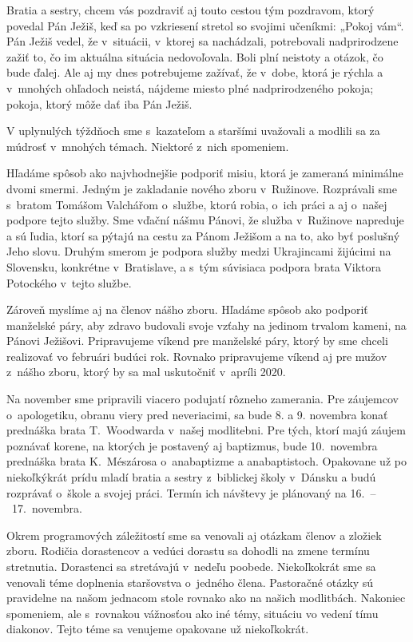 

Bratia a sestry, chcem vás pozdraviť aj touto cestou tým pozdravom, ktorý povedal Pán Ježiš, keď sa po vzkriesení stretol so svojimi učeníkmi: „Pokoj vám“. Pán Ježiš vedel, že v~situácii, v~ktorej sa nachádzali, potrebovali nadprirodzene zažiť to, čo im aktuálna situácia nedovoľovala. Boli plní neistoty a otázok, čo bude ďalej. Ale aj my dnes potrebujeme zažívať, že v~dobe, ktorá je rýchla a v~mnohých ohľadoch neistá, nájdeme miesto plné nadprirodzeného pokoja; pokoja, ktorý môže dať iba Pán Ježiš.

V uplynulých týždňoch sme s~kazateľom a staršími uvažovali a modlili sa za múdrosť v~mnohých témach. Niektoré z~nich spomeniem.

Hľadáme spôsob ako najvhodnejšie podporiť misiu, ktorá je zameraná minimálne dvomi smermi. Jedným je zakladanie nového zboru v~Ružinove. Rozprávali sme s~bratom Tomášom Valchářom o~službe, ktorú robia, o~ich práci a aj o~našej podpore tejto služby. Sme vďační nášmu Pánovi, že služba v~Ružinove napreduje a sú ľudia, ktorí sa pýtajú na cestu za Pánom Ježišom a na to, ako byť poslušný Jeho slovu. Druhým smerom je podpora služby medzi Ukrajincami žijúcimi na Slovensku, konkrétne v~Bratislave, a s~tým súvisiaca podpora brata Viktora Potockého v~tejto službe.

Zároveň myslíme aj na členov nášho zboru. Hľadáme spôsob ako podporiť manželské páry, aby zdravo budovali svoje vzťahy na jedinom trvalom kameni, na Pánovi Ježišovi. Pripravujeme víkend pre manželské páry, ktorý by sme chceli realizovať vo februári budúci rok. Rovnako pripravujeme víkend aj pre mužov z~nášho zboru, ktorý by sa mal uskutočniť v~apríli 2020.

Na november sme pripravili viacero podujatí rôzneho zamerania. Pre záujemcov o~apologetiku, obranu viery pred neveriacimi, sa bude 8. a 9. novembra konať prednáška brata T.~Woodwarda v~našej modlitebni. Pre tých, ktorí majú záujem poznávať korene, na ktorých je postavený aj baptizmus, bude 10.~novembra prednáška brata K.~Mészárosa o~anabaptizme a anabaptistoch. Opakovane už po niekoľkýkrát prídu mladí bratia a sestry z~biblickej školy v~Dánsku a budú rozprávať o~škole a svojej práci. Termín ich návštevy je plánovaný na 16.~--~17.~novembra.

Okrem programových záležitostí sme sa venovali aj otázkam členov a zložiek zboru. Rodičia dorastencov a vedúci dorastu sa dohodli na zmene termínu stretnutia. Dorastenci sa stretávajú v~nedeľu poobede. Niekoľkokrát sme sa venovali téme doplnenia staršovstva o~jedného člena. Pastoračné otázky sú pravidelne na našom jednacom stole rovnako ako na našich modlitbách. Nakoniec spomeniem, ale s~rovnakou vážnosťou ako iné témy, situáciu vo vedení tímu diakonov. Tejto téme sa venujeme opakovane už niekoľkokrát.

